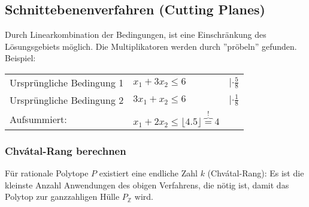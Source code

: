 \subsection{Schnittebenenverfahren (Cutting Planes) }  
	
	Durch Linearkombination der Bedingungen, ist eine Einschränkung des Lösungsgebiets möglich. Die Multiplikatoren werden durch ''pröbeln'' gefunden. Beispiel:
	
	\begin{tabular}{p{8cm} p{4cm} p{3cm}}
		Ursprüngliche Bedingung 1 & $x_1 + 3 x_2 \leq 6$ & $| \cdot \frac{5}{8}$\\
		Ursprüngliche Bedingung 2 & $3 x_1 + x_2 \leq 6$ & $| \cdot \frac{1}{8}$  \\
		Aufsummiert: & $x_1 + 2 x_2 \leq \lfloor 4.5 \rfloor \overbrace{=}^{!} 4$ \\
	\end{tabular}

\subsubsection{Chvátal-Rang berechnen }
Für rationale Polytope $P$ existiert eine endliche Zahl $k$ (Chvátal-Rang): Es ist die kleinste Anzahl Anwendungen des obigen Verfahrens, die nötig ist, damit das Polytop zur ganzzahligen Hülle $P_\mathbb{Z}$ wird.
